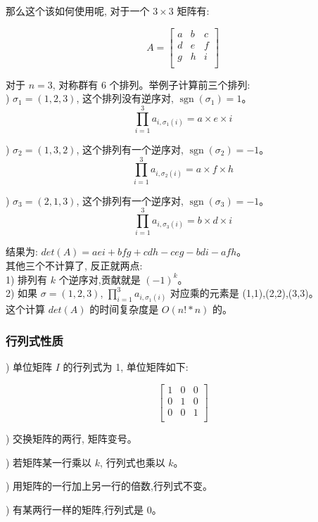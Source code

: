 \documentclass[a4paper,12pt]{article}
\begin{document}
\noindent 那么这个该如何使用呢, 对于一个 $3 \times 3$ 矩阵有:

$$A = \begin{bmatrix}
a&b&c\\
d&e&f\\
g&h&i\\
\end{bmatrix}$$

\noindent 对于 $n = 3$, 对称群有 6 个排列。举例子计算前三个排列: \\
) $\sigma_1 = (1,2,3)$, 这个排列没有逆序对, $\operatorname{sgn}(\sigma_1)=1$。
$$\prod_{i=1}^{3} a_{i,\sigma_1(i)} = a \times e \times i$$

) $\sigma_2 = (1,3,2)$, 这个排列有一个逆序对, $\operatorname{sgn}(\sigma_2)=-1$。
$$\prod_{i=1}^{3} a_{i,\sigma_2(i)} = a \times f \times h$$

) $\sigma_3 = (2,1,3)$, 这个排列有一个逆序对, $\operatorname{sgn}(\sigma_3)=-1$。
$$\prod_{i=1}^{3} a_{i,\sigma_3(i)} = b \times d \times i$$

\noindent 结果为: $det(A) = aei + bfg + cdh - ceg - bdi -afh$。\\

\noindent 其他三个不计算了, 反正就两点: \\
1) 排列有 $k$ 个逆序对,贡献就是 $(-1)^k$。\\
2) 如果 $\sigma = (1,2,3)$, $\prod_{i=1}^{3} a_{i,\sigma_1(i)}$ 对应乘的元素是 (1,1),(2,2),(3,3)。\\

\noindent 这个计算 $det(A)$ 的时间复杂度是 $O(n!*n)$ 的。

\subsubsection{行列式性质}

) 单位矩阵 $I$ 的行列式为 1, 单位矩阵如下:

$$\begin{bmatrix}
1&0&0\\
0&1&0\\
0&0&1\\
\end{bmatrix}$$

) 交换矩阵的两行, 矩阵变号。

) 若矩阵某一行乘以 $k$, 行列式也乘以 $k$。

) 用矩阵的一行加上另一行的倍数,行列式不变。

) 有某两行一样的矩阵,行列式是 0。
\end{document}
